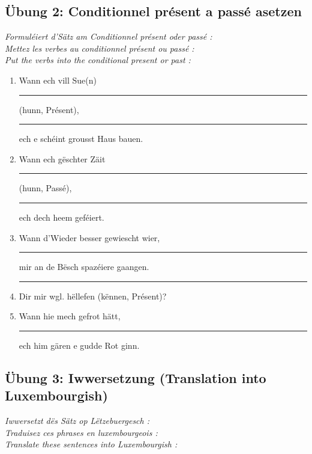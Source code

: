 \vspace{1.5em}

\subsection*{Übung 2: Conditionnel présent a passé asetzen}
\textit{Formuléiert d'Sätz am Conditionnel présent oder passé :}\\
\textit{Mettez les verbes au conditionnel présent ou passé :}\\
\textit{Put the verbs into the conditional present or past :}

\begin{enumerate}
    \item Wann ech vill Sue(n) \rule{2.2cm}{0.4pt} (hunn, Présent), \rule{2.2cm}{0.4pt} ech e schéint grousst Haus bauen.
    \item Wann ech gëschter Zäit \rule{2.2cm}{0.4pt} (hunn, Passé), \rule{2.2cm}{0.4pt} ech dech heem geféiert.
    \item Wann d'Wieder besser gewiescht wier, \rule{2.2cm}{0.4pt} mir an de Bësch spazéiere gaangen.
    \item \rule{2.2cm}{0.4pt} Dir mir wgl. hëllefen (kënnen, Présent)?
    \item Wann hie mech gefrot hätt, \rule{2.2cm}{0.4pt} ech him gären e gudde Rot ginn.
\end{enumerate}

\vspace{1.5em}

\subsection*{Übung 3: Iwwersetzung (Translation into Luxembourgish)}
\textit{Iwwersetzt dës Sätz op Lëtzebuergesch :}\\
\textit{Traduisez ces phrases en luxembourgeois :}\\
\textit{Translate these sentences into Luxembourgish :}

